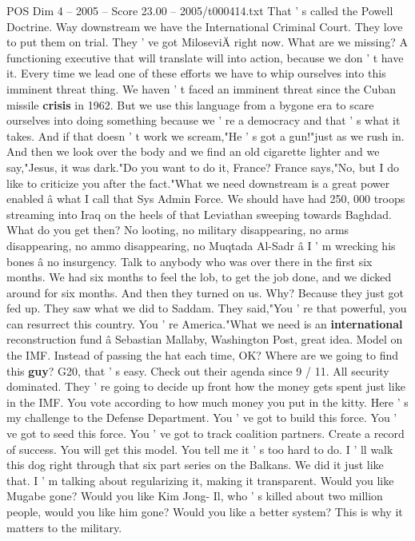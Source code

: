 \begin{textsample}{POS Dim 4 – 2005 – Score 23.00 – 2005/t000414.txt}
That ' s called the Powell Doctrine.
Way downstream we have the International Criminal Court.
They love to put them on trial.
They ' ve got MiloseviÄ right now.
What are we missing?
A functioning executive that will translate will into action, because we don ' t have it.
Every time we lead one of these efforts we have to whip ourselves into this imminent threat thing.
We haven ' t faced an imminent threat since the Cuban missile \textbf{crisis} in 1962.
But we use this language from a bygone era to scare ourselves into doing something because we ' re a democracy and that ' s what it takes.
And if that doesn ' t work we scream,"He ' s got a gun!"just as we rush in.
And then we look over the body and we find an old cigarette lighter and we say,"Jesus, it was dark."Do you want to do it, France?
France says,"No, but I do like to criticize you after the fact."What we need downstream is a great power enabled â what I call that Sys Admin Force.
We should have had 250, 000 troops streaming into Iraq on the heels of that Leviathan sweeping towards Baghdad.
What do you get then?
No looting, no military disappearing, no arms disappearing, no ammo disappearing, no Muqtada Al-Sadr â I ' m wrecking his bones â no insurgency.
Talk to anybody who was over there in the first six months.
We had six months to feel the lob, to get the job done, and we dicked around for six months.
And then they turned on us.
Why?
Because they just got fed up.
They saw what we did to Saddam.
They said,"You ' re that powerful, you can resurrect this country.
You ' re America."What we need is an \textbf{international} reconstruction fund â Sebastian Mallaby, Washington Post, great idea.
Model on the IMF.
Instead of passing the hat each time, OK?
Where are we going to find this \textbf{guy}?
G20, that ' s easy.
Check out their agenda since 9 / 11.
All security dominated.
They ' re going to decide up front how the money gets spent just like in the IMF.
You vote according to how much money you put in the kitty.
Here ' s my challenge to the Defense Department.
You ' ve got to build this force.
You ' ve got to seed this force.
You ' ve got to track coalition partners.
Create a record of success.
You will get this model.
You tell me it ' s too hard to do.
I ' ll walk this dog right through that six part series on the Balkans.
We did it just like that.
I ' m talking about regularizing it, making it transparent.
Would you like Mugabe gone?
Would you like Kim Jong- Il, who ' s killed about two million people, would you like him gone?
Would you like a better system?
This is why it matters to the military.

\end{textsample}
